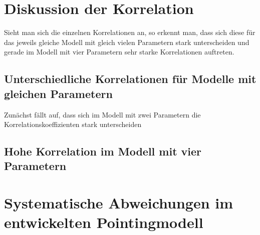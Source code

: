 \section{Diskussion der Korrelation}
Sieht man sich die einzelnen Korrelationen an, so erkennt man, dass sich diese für das jeweils gleiche Modell mit gleich vielen Parametern stark unterscheiden und gerade im Modell mit vier Parametern sehr starke Korrelationen auftreten.
\subsection{Unterschiedliche Korrelationen für Modelle mit gleichen Parametern}
Zunächst fällt auf, dass sich im Modell mit zwei Parametern die Korrelationskoeffizienten stark unterscheiden
\subsection{Hohe Korrelation im Modell mit vier Parametern}

\section{Systematische Abweichungen im entwickelten Pointingmodell}
